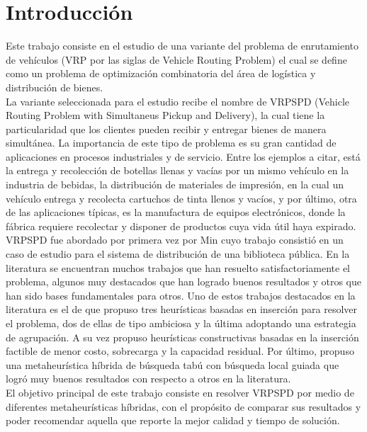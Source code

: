 \chapter*{Introducción} \label{chap:intro}

 Este trabajo consiste en el estudio de una variante del problema de enrutamiento de vehículos (VRP por las siglas de Vehicle Routing Problem) el cual se define como un problema de optimización combinatoria del área de logística y distribución de bienes.\\
 
 La variante seleccionada para el estudio recibe el nombre de  VRPSPD (Vehicle Routing Problem with Simultaneus Pickup and Delivery), la cual tiene la particularidad que los clientes pueden recibir y entregar bienes de manera simultánea. La importancia de este tipo de problema es su gran cantidad de aplicaciones en procesos industriales y de servicio. Entre los ejemplos a citar,  est\'{a} la entrega y recolección de botellas llenas y vacías por un mismo vehículo en la industria de bebidas, la distribución de materiales de impresión, en la cual un vehículo entrega y recolecta cartuchos de tinta llenos y  vacíos, y por \'{u}ltimo, otra de las aplicaciones típicas, es la manufactura de equipos electrónicos, donde la fábrica requiere recolectar y disponer de productos cuya vida útil haya expirado.\\ 
 
 VRPSPD fue abordado por primera vez por Min \cite{primervrpspd} cuyo trabajo consistió en un caso de estudio para el sistema de distribución de una biblioteca pública. En la literatura se encuentran muchos trabajos que han resuelto satisfactoriamente el problema, algunos muy destacados que han logrado buenos resultados y otros que han sido bases fundamentales para otros. Uno de estos trabajos destacados en la literatura es el de \cite{SalhiNagy} que propuso tres heurísticas basadas en inserción para resolver el problema, dos de ellas de tipo ambiciosa y la \'{u}ltima adoptando una estrategia de agrupación. A su vez \cite{Dethloff} propuso heurísticas constructivas basadas en la inserción factible de menor costo, sobrecarga y la capacidad residual. Por \'{u}ltimo, \cite{gts} propuso una metaheurística híbrida de b\'{u}squeda tabú con b\'{u}squeda local guiada que logró muy buenos resultados con respecto a otros en la literatura.\\

El objetivo principal de este trabajo consiste en resolver VRPSPD por medio de diferentes metaheurísticas híbridas, con el propósito de comparar sus resultados y poder recomendar aquella que reporte la mejor calidad y tiempo de solución. \\

